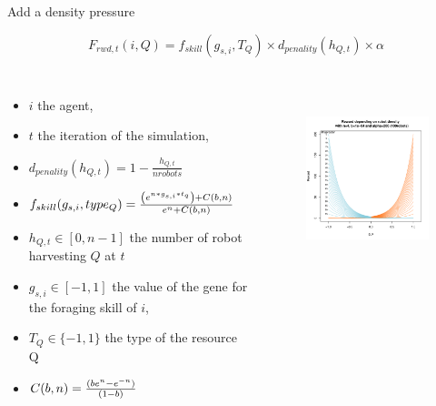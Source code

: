 \documentclass[8pt, handout=show,notes=show]{beamer}
\begin{document}
	\begin{frame}{Add a density pressure}\addtocounter{framenumber}{-1}
	
	$$F_{rwd,t}(i,Q) = f_{skill}\left(g_{s,i},T_Q\right)\times d_{penality}\left(h_{Q,t}\right)\times \alpha$$
	
	\begin{columns}
	
	
	
	\begin{itemize}
	\item $i$ the agent,
	\item $t$ the iteration of the simulation,
	\item $ d_{penality}(h_{Q,t}) =  1 - \frac {h_{Q,t}} {nrobots} $
	\item $ f_{skill}(g_{s,i},type_Q)= {\left(e^{n*g_{s,i}*t_q}\right)+C(b,n) \over {e^{n}+C(b,n)}}$
	\item $h_{Q,t} \in [0, n -1]$ the number of robot harvesting $Q$ at $t$ 
	\item $g_{s,i} \in [-1,1]$ the value of the gene for the foraging skill of $i$,
	\item $T_Q\in \{-1,1\}$ the type of the resource Q
	\item $ C(b,n) = {(be^{n} - e^{-n} )\over{(1-b)}} $
	\end{itemize}
	
	
	
	
	
	
	
	
	\begin{figure}
	\includegraphics[height=5.5cm]{images/densite}
	\end{figure}
	
	
	\end{columns}
	
	
	\end{frame}
	
	
	
\end{document}
